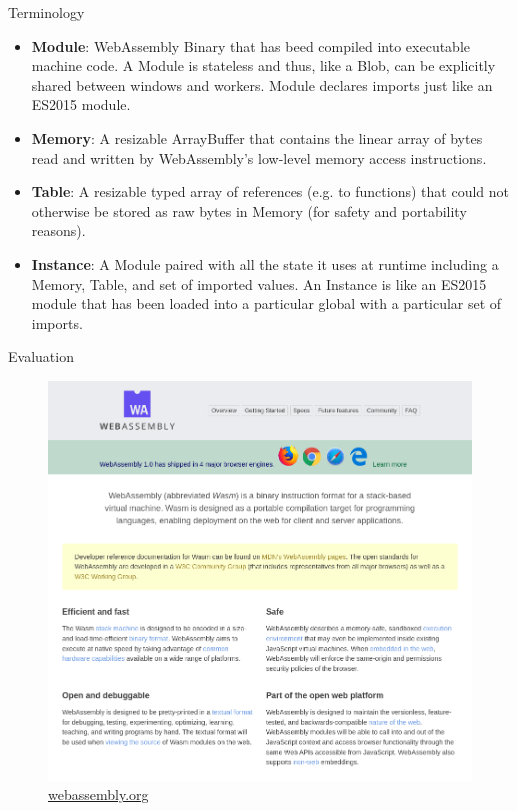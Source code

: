 \documentclass{beamer}
\begin{document}
\begin{frame}{Terminology}
\begin{itemize} 
    \item \textbf{Module}: WebAssembly Binary that has beed compiled into executable machine code. A Module is stateless and thus, like a Blob, can be explicitly shared between windows and workers. Module declares imports just like an ES2015 module.
    \item \textbf{Memory}: A resizable ArrayBuffer that contains the linear array of bytes read and written by WebAssembly’s low-level memory access instructions.
    \item \textbf{Table}: A resizable typed array of references (e.g. to functions) that could not otherwise be stored as raw bytes in Memory (for safety and portability reasons).
    \item \textbf{Instance}: A Module paired with all the state it uses at runtime including a Memory, Table, and set of imported values. An Instance is like an ES2015 module that has been loaded into a particular global with a particular set of imports.
\end{itemize}
\end{frame}

\begin{frame}{Evaluation}
    \begin{figure}
        \includegraphics[scale=0.2]{./images/webassembly_org.png}
        \caption{\href{https://webassembly.org/}{webassembly.org}}
    \end{figure}
\end{frame}
\end{document}
